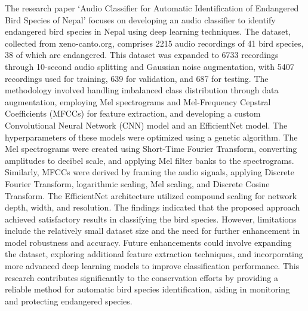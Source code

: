 The research paper `Audio Classifier for Automatic Identification of Endangered Bird Species of Nepal' focuses on developing an audio classifier to identify endangered bird species in Nepal using deep learning techniques. The dataset, collected from xeno-canto.org, comprises 2215 audio recordings of 41 bird species, 38 of which are endangered. This dataset was expanded to 6733 recordings through 10-second audio splitting and Gaussian noise augmentation, with 5407 recordings used for training, 639 for validation, and 687 for testing. The methodology involved handling imbalanced class distribution through data augmentation, employing Mel spectrograms and Mel-Frequency Cepstral Coefficients (MFCCs) for feature extraction, and developing a custom Convolutional Neural Network (CNN) model and an EfficientNet model. The hyperparameters of these models were optimized using a genetic algorithm. The Mel spectrograms were created using Short-Time Fourier Transform, converting amplitudes to decibel scale, and applying Mel filter banks to the spectrograms. Similarly, MFCCs were derived by framing the audio signals, applying Discrete Fourier Transform, logarithmic scaling, Mel scaling, and Discrete Cosine Transform. The EfficientNet architecture utilized compound scaling for network depth, width, and resolution. The findings indicated that the proposed approach achieved satisfactory results in classifying the bird species. However, limitations include the relatively small dataset size and the need for further enhancement in model robustness and accuracy. Future enhancements could involve expanding the dataset, exploring additional feature extraction techniques, and incorporating more advanced deep learning models to improve classification performance. This research contributes significantly to the conservation efforts by providing a reliable method for automatic bird species identification, aiding in monitoring and protecting endangered species.\cite{gautam2023audio}\\

